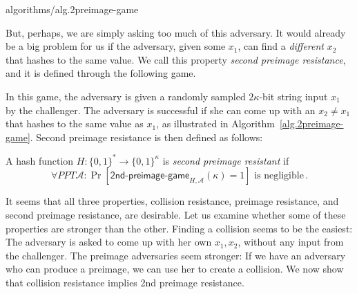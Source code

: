 {algorithms/alg.2preimage-game}

But, perhaps, we are simply asking too much of this adversary. It would already be a big problem
for us if the adversary, given some $x_1$, can find a \emph{different} $x_2$ that hashes to the same
value. We call this property \emph{second preimage resistance}, and it is defined through the following
game.

In this game, the adversary is given a randomly sampled $2\kappa$-bit string input $x_1$ by the challenger.
The adversary is successful if she can come up with an $x_2 \neq x_1$ that hashes to the same value as $x_1$,
as illustrated in Algorithm~\ref{alg.2preimage-game}.
Second preimage resistance is then defined as follows:

\begin{definition}
  A hash function $H: \{0, 1\}^* \longrightarrow \{0, 1\}^\kappa$ is \emph{second preimage resistant}
  if
  \[
    \forall PPT \mathcal{A}:
    \Pr[\textsf{2nd-preimage-game}_{H,\mathcal{A}}(\kappa) = 1] \text{ is negligible}\,.
  \]
\end{definition}

It seems that all three properties, collision resistance, preimage resistance, and second preimage
resistance, are desirable. Let us examine whether some of these properties are stronger than the other.
Finding a collision seems to be the easiest: The adversary is asked to come up with her own $x_1, x_2$,
without any input from the challenger. The preimage adversaries seem stronger: If we have
an adversary who can produce a preimage, we can use her to create a collision.
We now show that collision resistance implies 2nd preimage resistance.

